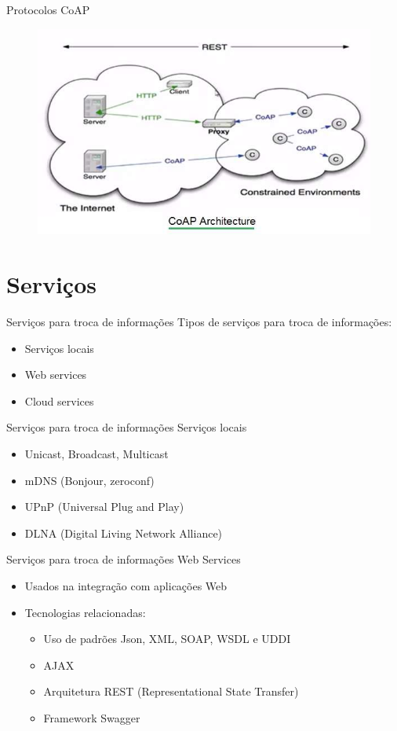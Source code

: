 \documentclass[t]{beamer}
\begin{document}
\begin{frame}{Protocolos}
CoAP
\begin{figure}
	\includegraphics[width=\linewidth]{CoAP-Architecture}
\end{figure}
\end{frame}

\section{Serviços}

\begin{frame}{Serviços para troca de informações}
Tipos de serviços para troca de informações:
\begin{itemize}
	\item Serviços locais
	\item Web services
	\item Cloud services
\end{itemize}
\end{frame}

\begin{frame}{Serviços para troca de informações}
Serviços locais
\begin{itemize}
	\item Unicast, Broadcast, Multicast
	\item mDNS (Bonjour, zeroconf)
	\item UPnP (Universal Plug and Play) 
	\item DLNA (Digital Living Network Alliance)
\end{itemize}
\end{frame}

\begin{frame}{Serviços para troca de informações}
Web Services
\begin{itemize}
	\item Usados na integração com aplicações Web
	\item Tecnologias relacionadas:
	\begin{itemize}
		\item Uso de padrões Json, XML, SOAP, WSDL e UDDI
		\item AJAX
		\item Arquitetura REST (Representational State Transfer)
		\item Framework Swagger	
	\end{itemize}	
\end{itemize}
\end{frame}
\end{document}
